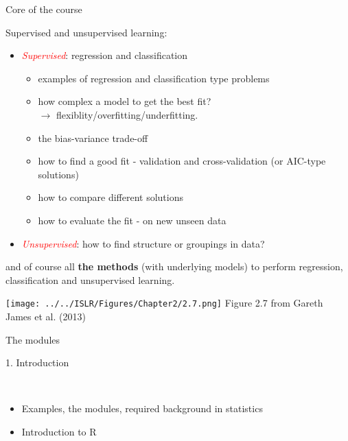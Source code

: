 \documentclass[10pt,ignorenonframetext,]{beamer}
\providecommand{\tightlist}{%
  \setlength{\itemsep}{0pt}\setlength{\parskip}{0pt}}
\begin{document}
\begin{frame}{Core of the course}
\protect\hypertarget{core-of-the-course}{}

Supervised and unsupervised learning:

\begin{itemize}
\tightlist
\item
  \emph{\textcolor{red}{Supervised}}: regression and classification

  \begin{itemize}
  \tightlist
  \item
    examples of regression and classification type problems
  \item
    how complex a model to get the best fit?\\
    \(\rightarrow\) flexiblity/overfitting/underfitting.
  \item
    the bias-variance trade-off
  \item
    how to find a good fit - validation and cross-validation (or
    AIC-type solutions)
  \item
    how to compare different solutions
  \item
    how to evaluate the fit - on new unseen data
  \end{itemize}
\end{itemize}

\vspace{2mm}

\begin{itemize}
\tightlist
\item
  \emph{\textcolor{red}{Unsupervised}}: how to find structure or
  groupings in data?
\end{itemize}

\vspace{2mm}

and of course all \textbf{the methods} (with underlying models) to
perform regression, classification and unsupervised learning.

\end{frame}

\begin{frame}

\centering

\texttt{[image: ../../ISLR/Figures/Chapter2/2.7.png]} Figure 2.7 from
Gareth James et al. (2013)

\end{frame}

\begin{frame}{The modules}
\protect\hypertarget{the-modules}{}

\begin{block}{1. Introduction}

\(~\)

\begin{itemize}
\tightlist
\item
  Examples, the modules, required background in statistics \vspace{2mm}
\item
  Introduction to R
\end{itemize}

\end{block}

\end{frame}
\end{document}
